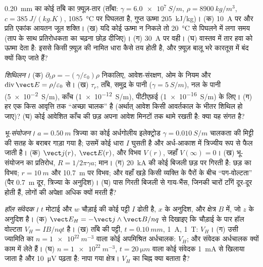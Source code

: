 \begin{exercise}[$\star\star$]\label{exo:b2:charges-currents-conduction:8}
\qty{0.20}{mm} का कोई ताँबे का फ़्यूज़-तार (ताँबा: $\gamma = \qty{6.0e7}{S/m}$, $\rho =
\qty{8900}{kg/m^3}$, $c = \qty{385}{J/(kg.K)}$, \qty{1085}{\degreeCelsius} पर पिघलता है,
गुप्त ऊष्मा \qty{205}{kJ/kg})। (क) \qty{10}{A} पर  और प्रति एकांक आयतन
जूल शक्ति। (ख) यदि कोई ऊष्मा न निकले तो \qty{20}{\degreeCelsius} से पिघलने में
लगा समय (ताप के साथ प्रतिरोधकता का चढ़ना छोड़ दीजिए)। (ग)
\qty{30}{A} पर वही। (घ) वास्तव में तार हवा को ऊष्मा देता है: इससे
किसी फ़्यूज़ की नामित धारा कैसे तय होती है, और फ़्यूज़ बालू भरे
कारतूस में बंद क्यों किए जाते हैं?
\end{exercise}

\begin{exercise}[$\star\star$]\label{exo:b2:charges-currents-conduction:9}
\emph{शिथिलन।} (क) $\partial_t\rho = -(\gamma/\varepsilon_0)\rho$ निकालिए, आवेश-संरक्षण,
ओम के नियम और $\operatorname{div}\vect E = \rho/\varepsilon_0$ से। (ख)
$\tau_r$, ताँबे, समुद्र के पानी ($\gamma = \qty{5}{S/m}$), नल के पानी
(\qty{5e-2}{S/m}), काँच (\qty{1e-12}{S/m}), पीटीएफ़ई (\qty{1e-16}{S/m}) के लिए। (ग)
हर एक किस आवृत्ति तक ``अच्छा चालक'' है (अर्थात् आवेश किसी आवर्तकाल के भीतर
शिथिल हो जाए)? (घ) कोई आवेशित काँच की छड़ अपना आवेश मिनटों तक थामे रखती है: क्या
यह संगत है?
\end{exercise}

\begin{exercise}[$\star\star\star$]\label{exo:b2:charges-currents-conduction:10}
\emph{भू-संयोजन।} $a = \qty{0.50}{m}$ त्रिज्या का कोई अर्धगोलीय इलेक्ट्रोड $\gamma =
\qty{0.010}{S/m}$ चालकता की मिट्टी की सतह के बराबर गाड़ा गया है;
उसमें कोई धारा $I$ घुसती है और अर्ध-आकाश में त्रिज्यीय रूप से फैल जाती है।
(क) $\vect j(r)$, $\vect E(r)$, और विभव $V(r)$, जहाँ $V(\infty) = 0$।
(ख) भू-संयोजन का प्रतिरोध, $R = 1/2\pi\gamma a$; मान। (ग) \qty{20}{kA} की
कोई बिजली छड़ पर गिरती है: छड़ का विभव;
$r = \qty{10}{m}$ और \qty{10.7}{m} पर विभव; और वहाँ खड़े किसी व्यक्ति के पैरों के बीच
``पग-वोल्टता'' (पैर \qty{0.7}{m} दूर, त्रिज्या के अनुदिश)।
(घ) पास गिरती बिजली से गाय-भैंस, जिनकी चारों टाँगें दूर-दूर होती हैं,
लोगों की अपेक्षा अधिक क्यों मरती हैं?
\end{exercise}

\begin{exercise}[$\star\star\star$]\label{exo:b2:charges-currents-conduction:11}
\emph{हॉल संवेदक।} $t$ मोटाई और $w$ चौड़ाई की कोई पट्टी $I$ ढोती है,
$x$ के अनुदिश, और क्षेत्र $B$ में, जो $z$ के अनुदिश है। (क) $\vect E_H = -\vect j\wedge\vect B
/nq$ से दिखाइए कि चौड़ाई के पार हॉल वोल्टता $V_H = IB/nqt$ है। (ख)
ताँबे की पट्टी, $t = \qty{0.10}{mm}$, \qty{1}{A}, \qty{1}{T}: $V_H$। (ग) उसी ज्यामिति का
$n = \qty{1e22}{m^{-3}}$ वाला कोई अपमिश्रित अर्धचालक: $V_H$; और संवेदक
अर्धचालक क्यों काम में लेते हैं। (घ) $n = \qty{1e22}{m^{-3}}$, $t =
\qty{20}{\micro m}$ वाला कोई संवेदक \qty{1}{mA} से खिलाया जाता है और \qty{10}{\micro V} पढ़ता है: नापा गया क्षेत्र।
$V_H$ का चिह्न क्या बताता है?
\end{exercise}

